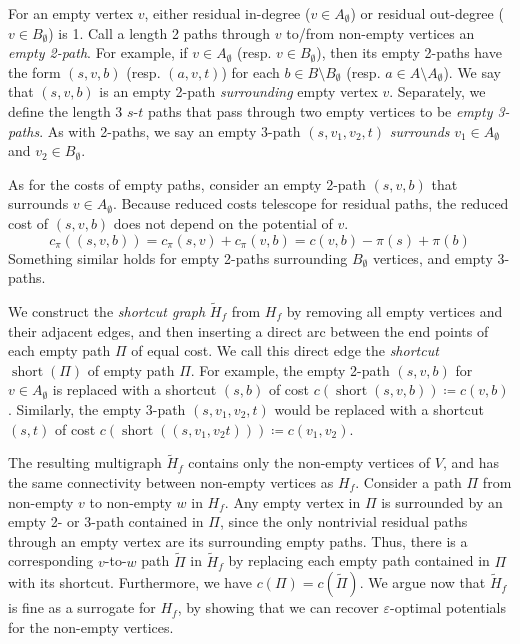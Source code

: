 \documentclass[11pt]{article}
\def\eps{\varepsilon}
\theoremstyle{plain}
\numberwithin{figure}{section}
\def\short{\operatorname{short}}
\begin{document}
For an empty vertex $v$, either residual in-degree ($v \in A_\emptyset$) or
residual out-degree ($v \in B_\emptyset$) is 1.
Call a length 2 paths through $v$ to/from non-empty vertices an
\emph{empty 2-path}.
For example, if $v \in A_\emptyset$ (resp. $v \in B_\emptyset$), then its empty
2-paths have the form $(s, v, b)$ (resp. $(a, v, t)$) for each
$b \in B \setminus B_\emptyset$ (resp. $a \in A \setminus A_\emptyset$).
We say that $(s, v, b)$ is an empty 2-path \emph{surrounding} empty vertex $v$.
Separately, we define the length 3 $s$-$t$ paths that pass through two empty
vertices to be \emph{empty 3-paths}.
As with 2-paths, we say an empty 3-path $(s, v_1, v_2, t)$ \emph{surrounds}
$v_1 \in A_\emptyset$ and $v_2 \in B_\emptyset$.

As for the costs of empty paths, consider an empty 2-path $(s, v, b)$ that
surrounds $v \in A_\emptyset$.
Because reduced costs telescope for residual paths, the reduced cost of
$(s, v, b)$ does not depend on the potential of $v$.
\begin{equation*}
	c_\pi((s, v, b)) = c_\pi(s, v) + c_\pi(v, b) = c(v, b) - \pi(s) + \pi(b)
\end{equation*}
Something similar holds for empty 2-paths surrounding $B_\emptyset$ vertices,
and empty 3-paths.

We construct the \emph{shortcut graph} $\tilde{H}_f$ from $H_f$ by removing all
empty vertices and their adjacent edges, and then inserting a direct arc
between the end points of each empty path $\Pi$ of equal cost.
We call this direct edge the \emph{shortcut} $\short(\Pi)$ of empty path $\Pi$.
For example, the empty 2-path $(s, v, b)$ for $v \in A_\emptyset$ is replaced
with a shortcut $(s, b)$ of cost $c(\short(s, v, b)) \coloneqq c(v, b)$.
Similarly, the empty 3-path $(s, v_1, v_2, t)$ would be replaced with a
shortcut $(s, t)$ of cost $c(\short((s, v_1, v_2 t))) \coloneqq c(v_1, v_2)$.

The resulting multigraph $\tilde{H}_f$ contains only the non-empty vertices of
$V$, and has the same connectivity between non-empty vertices as $H_f$.
Consider a path $\Pi$ from non-empty $v$ to non-empty $w$ in $H_f$.
Any empty vertex in $\Pi$ is surrounded by an empty 2- or 3-path contained
in $\Pi$, since the only nontrivial residual paths through an empty vertex are
its surrounding empty paths.
Thus, there is a corresponding $v$-to-$w$ path $\tilde{\Pi}$ in $\tilde{H}_f$
by replacing each empty path contained in $\Pi$ with its shortcut.
Furthermore, we have $c(\Pi) = c(\tilde{\Pi})$.
We argue now that $\tilde{H}_f$ is fine as a surrogate for $H_f$, by showing
that we can recover $\eps$-optimal potentials for the non-empty vertices.
\end{document}
